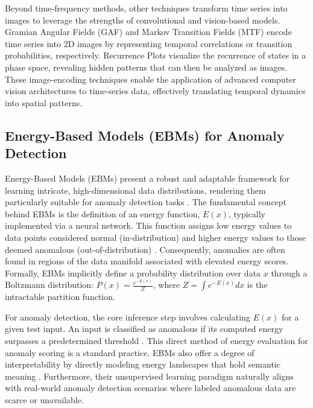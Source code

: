 \documentclass{article}
\begin{document}
Beyond time-frequency methods, other techniques transform time series into images to leverage the strengths of convolutional and vision-based models. Gramian Angular Fields (GAF) and Markov Transition Fields (MTF) \citep{wang_oates_2015} encode time series into 2D images by representing temporal correlations or transition probabilities, respectively. Recurrence Plots \citep{marwan_carmenromano_thiel_kurths_2007} visualize the recurrence of states in a phase space, revealing hidden patterns that can then be analyzed as images. These image-encoding techniques enable the application of advanced computer vision architectures to time-series data, effectively translating temporal dynamics into spatial patterns.

\subsection{Energy-Based Models (EBMs) for Anomaly Detection}
Energy-Based Models (EBMs) present a robust and adaptable framework for learning intricate, high-dimensional data distributions, rendering them particularly suitable for anomaly detection tasks \citep{du_mordatch_2019, nijkamp_hill_zhu_wu_2019, yoon_jin_noh_park_2023}. The fundamental concept behind EBMs is the definition of an energy function, $E(x)$, typically implemented via a neural network. This function assigns low energy values to data points considered normal (in-distribution) and higher energy values to those deemed anomalous (out-of-distribution) \citep{du_mordatch_2019, yoon_jin_noh_park_2023}. Consequently, anomalies are often found in regions of the data manifold associated with elevated energy scores. Formally, EBMs implicitly define a probability distribution over data $x$ through a Boltzmann distribution: $P(x) = \frac{e^{-E(x)}}{Z}$, where $Z = \int e^{-E(x)} dx$ is the intractable partition function.

For anomaly detection, the core inference step involves calculating $E(x)$ for a given test input. An input is classified as anomalous if its computed energy surpasses a predetermined threshold \citep{yoon_jin_noh_park_2023}. This direct method of energy evaluation for anomaly scoring is a standard practice. EBMs also offer a degree of interpretability by directly modeling energy landscapes that hold semantic meaning \citep{carbone_2025}. Furthermore, their unsupervised learning paradigm naturally aligns with real-world anomaly detection scenarios where labeled anomalous data are scarce or unavailable.
\end{document}
